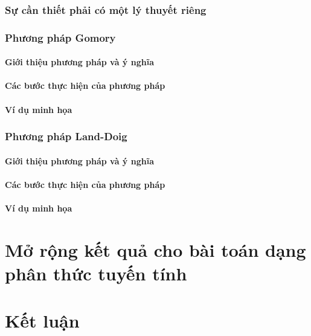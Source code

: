 \documentclass[12pt,a4paper]{report}
\begin{document}
\subsection{Sự cần thiết phải có một lý thuyết riêng}

\subsection{Phương pháp Gomory}

\subsubsection{Giới thiệu phương pháp và ý nghĩa}

\subsubsection{Các bước thực hiện của phương pháp}

\subsubsection{Ví dụ minh họa}


\subsection{Phương pháp Land-Doig}

\subsubsection{Giới thiệu phương pháp và ý nghĩa}

\subsubsection{Các bước thực hiện của phương pháp}

\subsubsection{Ví dụ minh họa}

\chapter{Mở rộng kết quả cho bài toán dạng phân thức tuyến tính}


\chapter*{Kết luận}                         %
\indent
\thispagestyle{fancy}
\end{document}
